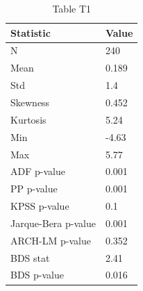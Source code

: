 \begin{table}[htbp]
\centering
\caption{Table T1}
\label{tab:T1}
\begin{tabular}{ll}
\toprule
Statistic & Value \\
\midrule
N & 240 \\
Mean & 0.189 \\
Std & 1.4 \\
Skewness & 0.452 \\
Kurtosis & 5.24 \\
Min & -4.63 \\
Max & 5.77 \\
ADF p-value & 0.001 \\
PP p-value & 0.001 \\
KPSS p-value & 0.1 \\
Jarque-Bera p-value & 0.001 \\
ARCH-LM p-value & 0.352 \\
BDS stat & 2.41 \\
BDS p-value & 0.016 \\
\bottomrule
\end{tabular}
\end{table}